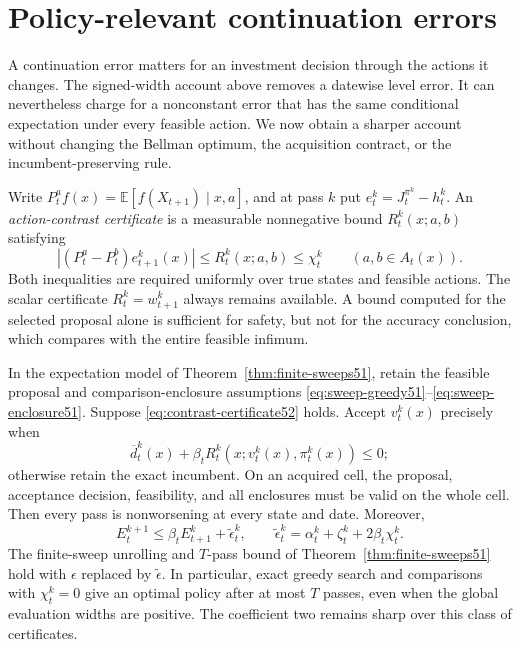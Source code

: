 \section{Policy-relevant continuation errors}\label{sec:contrast52}
A continuation error matters for an investment decision through the actions it changes. The signed-width account above removes a datewise level error. It can nevertheless charge for a nonconstant error that has the same conditional expectation under every feasible action. We now obtain a sharper account without changing the Bellman optimum, the acquisition contract, or the incumbent-preserving rule.

Write $P_t^a f(x)=\mathbb E[f(X_{t+1})\mid x,a]$, and at pass $k$ put $e_t^k=J_t^{\pi^k}-h_t^k$. An \emph{action-contrast certificate} is a measurable nonnegative bound $R_t^k(x;a,b)$ satisfying
\begin{equation}\label{eq:contrast-certificate52}
 |(P_t^a-P_t^b)e_{t+1}^k(x)|\le R_t^k(x;a,b)\le\chi_t^k
 \qquad(a,b\in A_t(x)).
\end{equation}
Both inequalities are required uniformly over true states and feasible actions. The scalar certificate $R_t^k=w_{t+1}^k$ always remains available. A bound computed for the selected proposal alone is sufficient for safety, but not for the accuracy conclusion, which compares with the entire feasible infimum.

\begin{theorem}\label{thm:contrast52}
In the expectation model of Theorem~\ref{thm:finite-sweeps51}, retain the feasible proposal and comparison-enclosure assumptions \eqref{eq:sweep-greedy51}--\eqref{eq:sweep-enclosure51}. Suppose \eqref{eq:contrast-certificate52} holds. Accept $v_t^k(x)$ precisely when
\begin{equation}\label{eq:contrast-gate52}
 \overline d_t^k(x)+\beta_tR_t^k(x;v_t^k(x),\pi_t^k(x))\le0;
\end{equation}
otherwise retain the exact incumbent. On an acquired cell, the proposal, acceptance decision, feasibility, and all enclosures must be valid on the whole cell. Then every pass is nonworsening at every state and date. Moreover,
\begin{equation}\label{eq:contrast-recursion52}
 E_t^{k+1}\le\beta_t E_{t+1}^k+\tilde\epsilon_t^k,
 \qquad \tilde\epsilon_t^k=\alpha_t^k+\zeta_t^k+2\beta_t\chi_t^k.
\end{equation}
The finite-sweep unrolling and $T$-pass bound of Theorem~\ref{thm:finite-sweeps51} hold with $\epsilon$ replaced by $\tilde\epsilon$. In particular, exact greedy search and comparisons with $\chi_t^k=0$ give an optimal policy after at most $T$ passes, even when the global evaluation widths are positive. The coefficient two remains sharp over this class of certificates.
\end{theorem}

